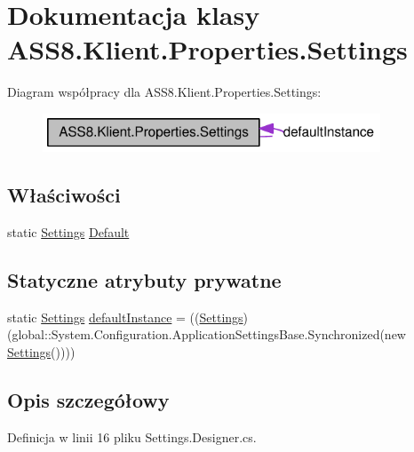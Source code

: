 \hypertarget{a00027}{
\section{Dokumentacja klasy ASS8.Klient.Properties.Settings}
\label{d0/d33/a00027}
}
Diagram współpracy dla ASS8.Klient.Properties.Settings:\nopagebreak
\begin{figure}[H]
\begin{center}
\leavevmode
\includegraphics[width=285pt]{d5/ddf/a00224}
\end{center}
\end{figure}
\subsection*{Właściwości}
\begin{CompactItemize}
\item 
static \hyperlink{a00027}{Settings} \hyperlink{a00027_3b1e7a8cb7c1642c0b661d0a42f5b023}{Default}
\end{CompactItemize}
\subsection*{Statyczne atrybuty prywatne}
\begin{CompactItemize}
\item 
static \hyperlink{a00027}{Settings} \hyperlink{a00027_b331e0a3aa3a08061108355a2fab8905}{defaultInstance} = ((\hyperlink{a00027}{Settings})(global::System.Configuration.ApplicationSettingsBase.Synchronized(new \hyperlink{a00027}{Settings}())))
\end{CompactItemize}


\subsection{Opis szczegółowy}


Definicja w linii 16 pliku Settings.Designer.cs.

